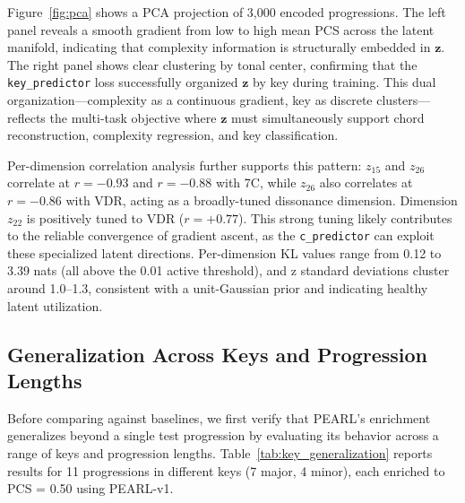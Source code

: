 \documentclass[conference]{IEEEtran}
\begin{document}
Figure~\ref{fig:pca} shows a PCA projection of 3,000 encoded progressions. The left panel reveals a smooth gradient from low to high mean PCS across the latent manifold, indicating that complexity information is structurally embedded in $\mathbf{z}$. The right panel shows clear clustering by tonal center, confirming that the \texttt{key\_predictor} loss successfully organized $\mathbf{z}$ by key during training. This dual organization---complexity as a continuous gradient, key as discrete clusters---reflects the multi-task objective where $\mathbf{z}$ must simultaneously support chord reconstruction, complexity regression, and key classification.

Per-dimension correlation analysis further supports this pattern: $z_{15}$ and $z_{26}$ correlate at $r = -0.93$ and $r = -0.88$ with 7C, while $z_{26}$ also correlates at $r = -0.86$ with VDR, acting as a broadly-tuned dissonance dimension. Dimension $z_{22}$ is positively tuned to VDR ($r = +0.77$). This strong tuning likely contributes to the reliable convergence of gradient ascent, as the \texttt{c\_predictor} can exploit these specialized latent directions. Per-dimension KL values range from 0.12 to 3.39 nats (all above the 0.01 active threshold), and z standard deviations cluster around 1.0--1.3, consistent with a unit-Gaussian prior and indicating healthy latent utilization.

\subsection{Generalization Across Keys and Progression Lengths}

Before comparing against baselines, we first verify that PEARL's enrichment generalizes beyond a single test progression by evaluating its behavior across a range of keys and progression lengths. Table~\ref{tab:key_generalization} reports results for 11 progressions in different keys (7 major, 4 minor), each enriched to PCS = 0.50 using PEARL-v1.
\end{document}
